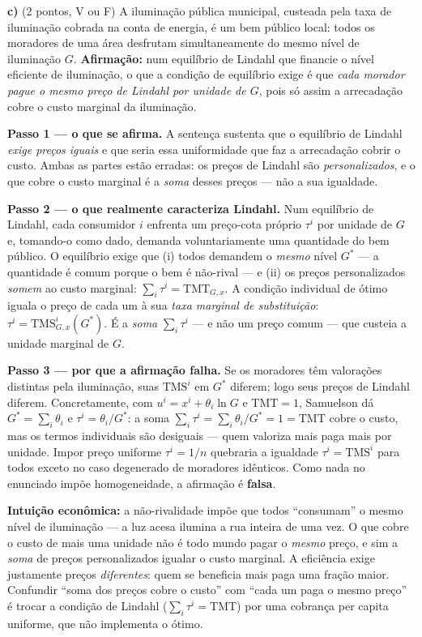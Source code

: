 \textbf{c)} (2 pontos, V ou F) A iluminação pública municipal, custeada pela taxa de iluminação cobrada na conta de energia, é um bem público local: todos os moradores de uma área desfrutam simultaneamente do mesmo nível de iluminação $G$. \textbf{Afirmação:} num equilíbrio de Lindahl que financie o nível eficiente de iluminação, o que a condição de equilíbrio exige é que \emph{cada morador pague o mesmo preço de Lindahl por unidade de $G$}, pois só assim a arrecadação cobre o custo marginal da iluminação.

\begin{solucao}
\textbf{Passo 1 — o que se afirma.} A sentença sustenta que o equilíbrio de Lindahl \emph{exige preços iguais} e que seria essa uniformidade que faz a arrecadação cobrir o custo. Ambas as partes estão erradas: os preços de Lindahl são \emph{personalizados}, e o que cobre o custo marginal é a \emph{soma} desses preços — não a sua igualdade.

\textbf{Passo 2 — o que realmente caracteriza Lindahl.} Num equilíbrio de Lindahl, cada consumidor $i$ enfrenta um preço-cota próprio $\tau^{i}$ por unidade de $G$ e, tomando-o como dado, demanda voluntariamente uma quantidade do bem público. O equilíbrio exige que (i) todos demandem o \emph{mesmo} nível $G^{*}$ — a quantidade é comum porque o bem é não-rival — e (ii) os preços personalizados \emph{somem} ao custo marginal: $\sum_i \tau^{i}=\text{TMT}_{G,x}$. A condição individual de ótimo iguala o preço de cada um à sua \emph{taxa marginal de substituição}: $\tau^{i}=\text{TMS}^{i}_{G,x}(G^{*})$. É a \emph{soma} $\sum_i\tau^i$ — e não um preço comum — que custeia a unidade marginal de $G$.

\textbf{Passo 3 — por que a afirmação falha.} Se os moradores têm valorações distintas pela iluminação, suas $\text{TMS}^{i}$ em $G^{*}$ diferem; logo seus preços de Lindahl diferem. Concretamente, com $u^{i}=x^{i}+\theta_i\ln G$ e $\text{TMT}=1$, Samuelson dá $G^{*}=\sum_i\theta_i$ e $\tau^{i}=\theta_i/G^{*}$: a soma $\sum_i\tau^i=\sum_i\theta_i/G^{*}=1=\text{TMT}$ cobre o custo, mas os termos individuais são desiguais — quem valoriza mais paga mais por unidade. Impor preço uniforme $\tau^i=1/n$ quebraria a igualdade $\tau^i=\text{TMS}^i$ para todos exceto no caso degenerado de moradores idênticos. Como nada no enunciado impõe homogeneidade, a afirmação é \textbf{falsa}.

\textbf{Intuição econômica:} a não-rivalidade impõe que todos ``consumam'' o mesmo nível de iluminação — a luz acesa ilumina a rua inteira de uma vez. O que cobre o custo de mais uma unidade não é todo mundo pagar o \emph{mesmo} preço, e sim a \emph{soma} de preços personalizados igualar o custo marginal. A eficiência exige justamente preços \emph{diferentes}: quem se beneficia mais paga uma fração maior. Confundir ``soma dos preços cobre o custo'' com ``cada um paga o mesmo preço'' é trocar a condição de Lindahl ($\sum_i\tau^i=\text{TMT}$) por uma cobrança per capita uniforme, que não implementa o ótimo.
\end{solucao}

